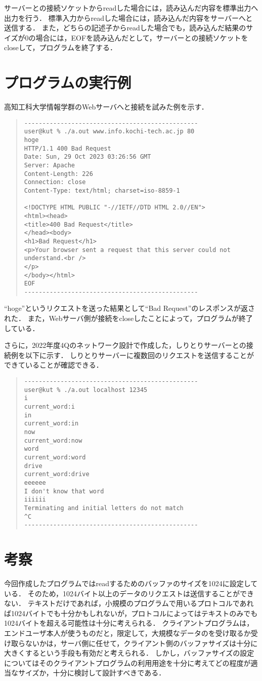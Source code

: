 \documentclass[a4paper,dvipdfmx]{jsarticle}
\begin{document}
サーバーとの接続ソケットからreadした場合には，読み込んだ内容を標準出力へ出力を行う．
標準入力からreadした場合には，読み込んだ内容をサーバーへと送信する．
また，どちらの記述子からreadした場合でも，読み込んだ結果のサイズが0の場合には，EOFを読み込んだとして，サーバーとの接続ソケットをcloseして，プログラムを終了する．

\section{プログラムの実行例}
高知工科大学情報学群のWebサーバへと接続を試みた例を示す．
\begin{quote}
\begin{verbatim}
------------------------------------------------
user@kut % ./a.out www.info.kochi-tech.ac.jp 80
hoge
HTTP/1.1 400 Bad Request
Date: Sun, 29 Oct 2023 03:26:56 GMT
Server: Apache
Content-Length: 226
Connection: close
Content-Type: text/html; charset=iso-8859-1

<!DOCTYPE HTML PUBLIC "-//IETF//DTD HTML 2.0//EN">
<html><head>
<title>400 Bad Request</title>
</head><body>
<h1>Bad Request</h1>
<p>Your browser sent a request that this server could not understand.<br />
</p>
</body></html>
EOF
------------------------------------------------
\end{verbatim}
\end{quote}
``hoge''というリクエストを送った結果として``Bad Request''のレスポンスが返された．
また，Webサーバ側が接続をcloseしたことによって，プログラムが終了している．

さらに，2022年度4Qのネットワーク設計で作成した，しりとりサーバーとの接続例を以下に示す．
しりとりサーバーに複数回のリクエストを送信することができていることが確認できる．
\begin{quote}
\begin{verbatim}
------------------------------------------------
user@kut % ./a.out localhost 12345            
i
current_word:i
in
current_word:in
now
current_word:now
word
current_word:word
drive
current_word:drive
eeeeee
I don't know that word
iiiiii
Terminating and initial letters do not match
^C
------------------------------------------------
\end{verbatim}
\end{quote}

\section{考察}
今回作成したプログラムではreadするためのバッファのサイズを1024に設定している．
そのため，1024バイト以上のデータのリクエストは送信することができない．
テキストだけであれば，小規模のプログラムで用いるプロトコルであれば1024バイトでも十分かもしれないが，プロトコルによってはテキストのみでも1024バイトを超える可能性は十分に考えられる．
クライアントプログラムは，エンドユーザ本人が使うものだと，限定して，大規模なデータのを受け取るか受け取らないかは，サーバ側に任せて，クライアント側のバッファサイズは十分に大きくするという手段も有効だと考えられる．
しかし，バッファサイズの設定についてはそのクライアントプログラムの利用用途を十分に考えてどの程度が適当なサイズか，十分に検討して設計すべきである．
\end{document}
